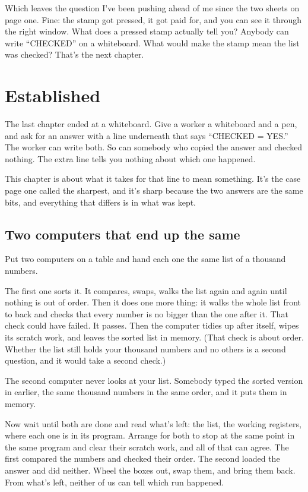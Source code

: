 \documentclass[11pt,twoside]{article}
\theoremstyle{thielethm}
\theoremstyle{thieledef}
\theoremstyle{thieledef}
\theoremstyle{thieledef}
\theoremstyle{thielethm}
\theoremstyle{thieleobs}
\theoremstyle{thielethm}
\begin{document}
Which leaves the question I've been pushing ahead of me since the two sheets on page one. Fine: the stamp got pressed, it got paid for, and you can see it through the right window. What does a pressed stamp actually tell you? Anybody can write ``CHECKED'' on a whiteboard. What would make the stamp mean the list was checked? That's the next chapter.

\section{Established}
\label{sec:established}

The last chapter ended at a whiteboard. Give a worker a whiteboard and a pen, and ask for an answer with a line underneath that says ``CHECKED = YES.'' The worker can write both. So can somebody who copied the answer and checked nothing. The extra line tells you nothing about which one happened.

This chapter is about what it takes for that line to mean something. It's the case page one called the sharpest, and it's sharp because the two answers are the same bits, and everything that differs is in what was kept.

\subsection{Two computers that end up the same}

Put two computers on a table and hand each one the same list of a thousand numbers.

The first one sorts it. It compares, swaps, walks the list again and again until nothing is out of order. Then it does one more thing: it walks the whole list front to back and checks that every number is no bigger than the one after it. That check could have failed. It passes. Then the computer tidies up after itself, wipes its scratch work, and leaves the sorted list in memory. (That check is about order. Whether the list still holds your thousand numbers and no others is a second question, and it would take a second check.)

The second computer never looks at your list. Somebody typed the sorted version in earlier, the same thousand numbers in the same order, and it puts them in memory.

Now wait until both are done and read what's left: the list, the working registers, where each one is in its program. Arrange for both to stop at the same point in the same program and clear their scratch work, and all of that can agree. The first compared the numbers and checked their order. The second loaded the answer and did neither. Wheel the boxes out, swap them, and bring them back. From what's left, neither of us can tell which run happened.
\end{document}
